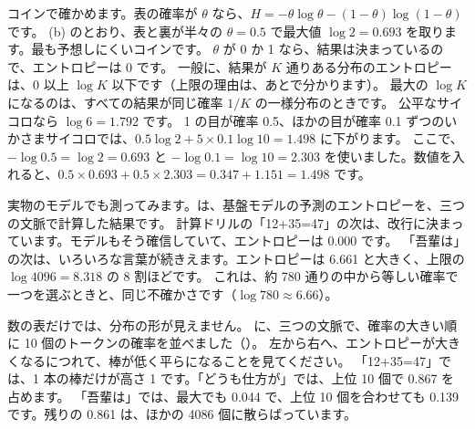 コインで確かめます。表の確率が $\theta$ なら、$H=-\theta\log\theta-(1-\theta)\log(1-\theta)$ です。
(b) のとおり、表と裏が半々の $\theta=0.5$ で最大値 $\log 2=0.693$ を取ります。最も予想しにくいコインです。
$\theta$ が 0 か 1 なら、結果は決まっているので、エントロピーは 0 です。
一般に、結果が $K$ 通りある分布のエントロピーは、0 以上 $\log K$ 以下です（上限の理由は、あとで分かります）。
最大の $\log K$ になるのは、すべての結果が同じ確率 $1/K$ の一様分布のときです。
公平なサイコロなら $\log 6=1.792$ です。
1 の目が確率 0.5、ほかの目が確率 0.1 ずつのいかさまサイコロでは、$0.5\log 2+5\times 0.1\log 10=1.498$ に下がります。
ここで、$-\log 0.5=\log 2=0.693$ と $-\log 0.1=\log 10=2.303$ を使いました。数値を入れると、$0.5\times 0.693+0.5\times 2.303=0.347+1.151=1.498$ です。

実物のモデルでも測ってみます。は、基盤モデルの予測のエントロピーを、三つの文脈で計算した結果です。
計算ドリルの「12+35=47」の次は、改行に決まっています。モデルもそう確信していて、エントロピーは 0.000 です。
「吾輩は」の次は、いろいろな言葉が続きえます。エントロピーは 6.661 と大きく、上限の $\log 4096=8.318$ の 8 割ほどです。
これは、約 780 通りの中から等しい確率で一つを選ぶときと、同じ不確かさです（$\log 780\approx 6.66$）。

数の表だけでは、分布の形が見えません。
に、三つの文脈で、確率の大きい順に 10 個のトークンの確率を並べました（）。
左から右へ、エントロピーが大きくなるにつれて、棒が低く平らになることを見てください。
「12+35=47」では、1 本の棒だけが高さ 1 です。「どうも仕方が」では、上位 10 個で 0.867 を占めます。
「吾輩は」では、最大でも 0.044 で、上位 10 個を合わせても 0.139 です。残りの 0.861 は、ほかの 4086 個に散らばっています。

